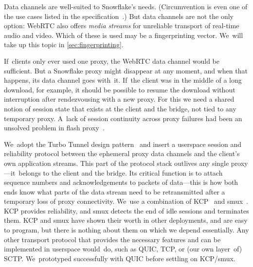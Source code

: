 \documentclass[letterpaper,twocolumn]{article}
\newcommand{\firstterm}[1]{\textit{#1}}
\begin{document}
Data channels are well-suited to Snowflake's needs.
(Circumvention is even one of the use cases listed in the specification~\cite[\S 3.2]{rfc8831}.)
But data channels are not the only option:
WebRTC also offers \firstterm{media streams}
for unreliable transport of real-time audio and video.
Which of these is used may be a fingerprinting vector.
We~will take up this topic in \autoref{sec:fingerprinting}.

If~clients only ever used one proxy,
the WebRTC data channel would be sufficient.
But a Snowflake proxy might
disappear at any moment,
and when that happens, its data channel goes with~it.
If~the client was in the middle of a long download,
for example, it should be possible to resume the download
without interruption after rendezvousing with a new proxy.
For this we need a shared notion of session state that exists
at the client and the bridge, not tied to any temporary proxy.
A~lack of session continuity across proxy failures
had been an unsolved problem in flash proxy~\cite[\S 5.2]{Fifield2012a}.

We~adopt the
Turbo Tunnel design pattern~\cite{Fifield2020a}
and insert a userspace
session and reliability protocol
between the ephemeral proxy data channels
and the client's own application streams.
This part of the protocol stack
outlives any single proxy---it~belongs to
the client and the bridge.
Its critical function is to attach sequence numbers and acknowledgements
to packets of data---this
is how both ends know what parts of the data stream
need to be retransmitted after a temporary loss of proxy connectivity.
We~use a combination of
KCP~\cite{kcp} and
smux~\cite{smux}.
KCP provides reliability,
and smux detects the end of idle sessions and terminates them.
KCP and smux have shown their worth in other deployments,
and are easy to program,
but there is nothing about them on which we depend essentially.
Any other transport protocol that provides the necessary features
and can be implemented in userspace would~do,
such as QUIC, TCP, or (our own layer~of) SCTP.
We~prototyped successfully with QUIC before settling on KCP/\allowbreak smux.

%
\end{document}
